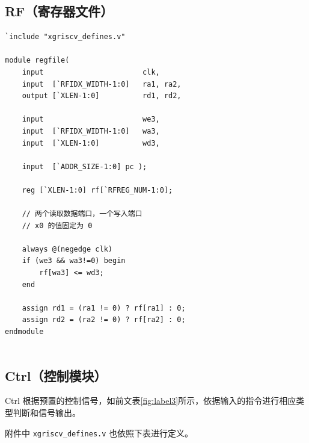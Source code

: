 \documentclass[UTF8,a4paper,autofakebold,15pt]{ctexart}
\begin{document}
\subsection{RF（寄存器文件）}

{\lstset{language=verilog}
	\begin{lstlisting}
`include "xgriscv_defines.v"

module regfile(
	input                      	clk,
	input  [`RFIDX_WIDTH-1:0]  	ra1, ra2,
	output [`XLEN-1:0]          rd1, rd2,
	
	input                      	we3, 
	input  [`RFIDX_WIDTH-1:0]  	wa3,
	input  [`XLEN-1:0]          wd3,
	
	input  [`ADDR_SIZE-1:0] pc );

	reg [`XLEN-1:0] rf[`RFREG_NUM-1:0];
	
	// 两个读取数据端口，一个写入端口
	// x0 的值固定为 0

	always @(negedge clk)
	if (we3 && wa3!=0) begin
		rf[wa3] <= wd3;
	end

	assign rd1 = (ra1 != 0) ? rf[ra1] : 0;
	assign rd2 = (ra2 != 0) ? rf[ra2] : 0;
endmodule
		
\end{lstlisting}}

\subsection{Ctrl（控制模块）}

Ctrl 根据预置的控制信号，如前文表\ref{fig:label3}所示，依据输入的指令进行相应类型判断和信号输出。

附件中 {\tt xgriscv\_defines.v} 也依照下表进行定义。
\end{document}
